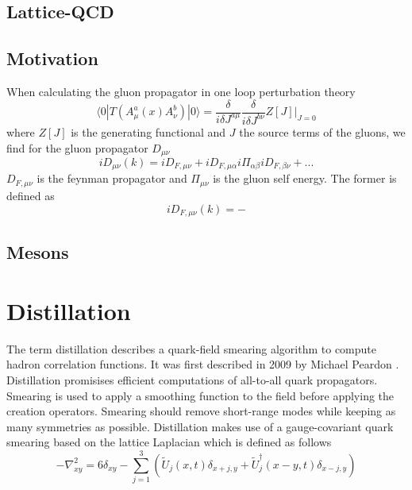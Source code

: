 \documentclass{style}
\begin{document}
	
	\subsection{Lattice-QCD}
	\subsection{Motivation}
	When calculating the gluon propagator in one loop perturbation theory \cite{qcd2_script_philipsen}
	\begin{equation}
	    \langle 0|T(A^a_\mu(x)A^b_\nu)|0\rangle = \frac{\delta}{i\delta J^{a\mu}} \frac{\delta}{i\delta J^{b\nu}} Z[J]\Big|_{J=0}
	\end{equation}
	where $Z[J]$ is the generating functional and $J$ the source terms of the gluons, we find for the gluon propagator $D_{\mu\nu}$
	\begin{equation}
	    i D_{\mu\nu}(k) = i D_{F,\mu\nu} + i D_{F,\mu\alpha} i\Pi_{\alpha\beta} i D_{F,\beta\nu} + ...
	\end{equation}
	$D_{F,\mu\nu}$ is the feynman propagator and $\Pi_{\mu\nu}$ is the gluon self energy. The former is defined as
	\begin{equation}
	    iD_{F,\mu\nu}(k) = -
	\end{equation}
	
	
	\subsection{Mesons}
	
	\newpage
	
	\section{Distillation}
	The term distillation describes a quark-field smearing algorithm to compute hadron correlation functions. It was first described in 2009 by Michael Peardon \cite{distillation_paper}. Distillation promisises efficient computations of all-to-all quark propagators.\\
	
	Smearing is used to apply a smoothing function to the field before applying the creation operators. Smearing should remove short-range modes while keeping as many symmetries as possible. Distillation makes use of a gauge-covariant quark smearing based on the lattice Laplacian which is defined as follows
	\begin{equation}
	    -\nabla^2_{xy} = 6\delta_{xy} - \sum^3_{j=1}(\tilde{U}_j(x,t)\delta_{x+j,y} + \tilde{U}^\dagger_j(x-y,t)\delta_{x-j,y})
	\end{equation}
	
\end{document}
